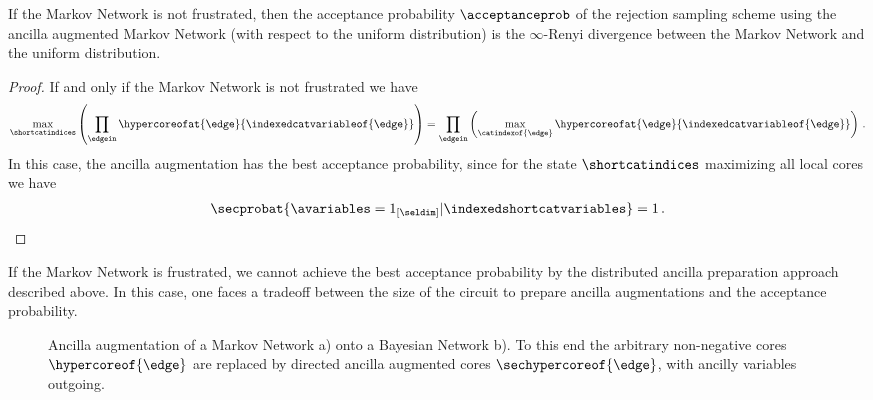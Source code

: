 \begin{lemma} %
    If the Markov Network is not frustrated, then the acceptance probability $\acceptanceprob$ of the rejection sampling scheme using the ancilla augmented Markov Network (with respect to the uniform distribution) is the $\infty$-Renyi divergence between the Markov Network and the uniform distribution.
\end{lemma}
\begin{proof}
    If and only if the Markov Network is not frustrated we have
    \begin{align*}
        \max_{\shortcatindices} \left(\prod_{\edgein}\hypercoreofat{\edge}{\indexedcatvariableof{\edge}}\right)
        = \prod_{\edgein} \left(\max_{\catindexof{\edge}} \hypercoreofat{\edge}{\indexedcatvariableof{\edge}}\right) \, .
    \end{align*}
    In this case, the ancilla augmentation has the best acceptance probability, since for the state $\shortcatindices$ maximizing all local cores we have
    \begin{align*}
        \secprobat{\avariables=1_{[\seldim]}|\indexedshortcatvariables} = 1 \, .
    \end{align*}
\end{proof}

If the Markov Network is frustrated, we cannot achieve the best acceptance probability by the distributed ancilla preparation approach described above.
In this case, one faces a tradeoff between the size of the circuit to prepare ancilla augmentations and the acceptance probability.

\begin{figure}
    \begin{center}
        
    \end{center}
    \caption{Ancilla augmentation of a Markov Network a) onto a Bayesian Network b).
    To this end the arbitrary non-negative cores $\hypercoreof{\edge}$ are replaced by directed ancilla augmented cores $\sechypercoreof{\edge}$, with ancilly variables outgoing.}
    \label{fig:markovNetworkAugmentation}
\end{figure}

